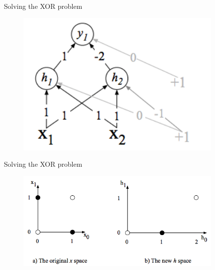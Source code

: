 \begin{frame}{Solving the XOR problem}
\begin{figure}
\centering
\includegraphics[width=0.90\textwidth]{figures/ff/xorsolnnet.png}
\end{figure}
\end{frame}

\begin{frame}{Solving the XOR problem}
\begin{figure}
\centering
\includegraphics[width=0.90\textwidth]{figures/ff/xorsoln.png}
\end{figure}
\end{frame}

